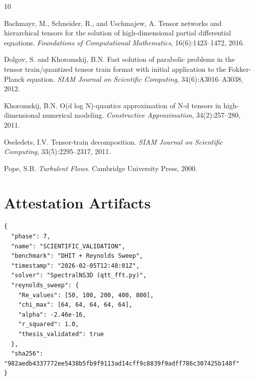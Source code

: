 \documentclass[11pt,a4paper]{article}
\theoremstyle{definition}
\begin{document}

\begin{thebibliography}{10}

Bachmayr, M., Schneider, R., and Uschmajew, A.
\newblock Tensor networks and hierarchical tensors for the solution of high-dimensional partial differential equations.
\newblock \emph{Foundations of Computational Mathematics}, 16(6):1423--1472, 2016.

Dolgov, S. and Khoromskij, B.N.
\newblock Fast solution of parabolic problems in the tensor train/quantized tensor train format with initial application to the Fokker-Planck equation.
\newblock \emph{SIAM Journal on Scientific Computing}, 34(6):A3016--A3038, 2012.

Khoromskij, B.N.
\newblock O(d log N)-quantics approximation of N-d tensors in high-dimensional numerical modeling.
\newblock \emph{Constructive Approximation}, 34(2):257--280, 2011.

Oseledets, I.V.
\newblock Tensor-train decomposition.
\newblock \emph{SIAM Journal on Scientific Computing}, 33(5):2295--2317, 2011.

Pope, S.B.
\newblock \emph{Turbulent Flows}.
\newblock Cambridge University Press, 2000.

\end{thebibliography}

\appendix
\section{Attestation Artifacts}
\label{app:attestation}

\begin{verbatim}
{
  "phase": 7,
  "name": "SCIENTIFIC_VALIDATION",
  "benchmark": "DHIT + Reynolds Sweep",
  "timestamp": "2026-02-05T12:48:01Z",
  "solver": "SpectralNS3D (qtt_fft.py)",
  "reynolds_sweep": {
    "Re_values": [50, 100, 200, 400, 800],
    "chi_max": [64, 64, 64, 64, 64],
    "alpha": -2.46e-16,
    "r_squared": 1.0,
    "thesis_validated": true
  },
  "sha256": "982aedb4337772ee5438b5fb9f9113ad14cff9c8839f9adff786c307425b148f"
}
\end{verbatim}
\end{document}
